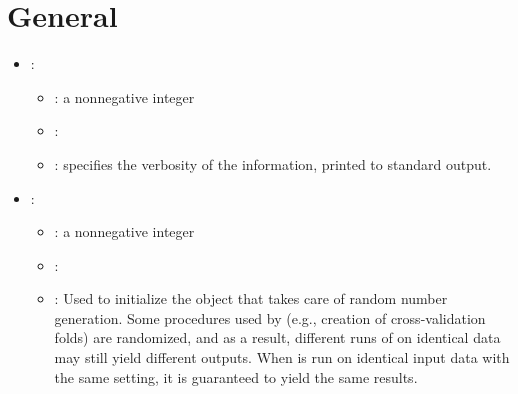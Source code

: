 
\section{General}
\begin{itemize}
    \item {}:
           \begin{itemize}
                \item \optionPossibleValues{}: a nonnegative integer
                \item \optionDefaultValue{}: 
                \item \optionDescrption{}: specifies the verbosity of the information, printed to standard output.
           \end{itemize}
    \item {}: \label{sett:randomSeed}
           \begin{itemize}
                \item \optionPossibleValues{}:  a nonnegative integer
                \item \optionDefaultValue{}: 
                \item \optionDescrption{}: Used to initialize the object that takes care of random number generation. Some procedures used by \clus{} (e.g., creation of cross-validation folds) are randomized, and as a result, different runs of \clus{} on identical data may still yield different outputs.  When \clus{} is run on identical input data with the same  setting, it is guaranteed to yield the same results.
           \end{itemize}
\end{itemize}

